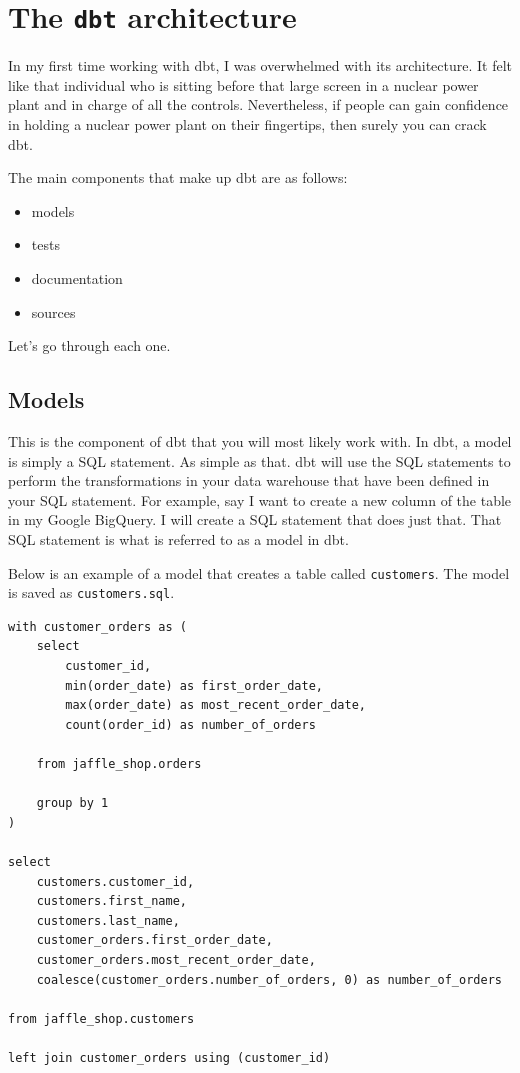 \documentclass[
]{book}
\begin{document}
\hypertarget{the-dbt-architecture}{%
\chapter{\texorpdfstring{The \texttt{dbt} architecture}{The dbt architecture}}\label{the-dbt-architecture}}

In my first time working with dbt, I was overwhelmed with its architecture. It felt like that individual who is sitting before that large screen in a nuclear power plant and in charge of all the controls. Nevertheless, if people can gain confidence in holding a nuclear power plant on their fingertips, then surely you can crack dbt.

The main components that make up dbt are as follows:

\begin{itemize}
\item
  models
\item
  tests
\item
  documentation
\item
  sources
\end{itemize}

Let's go through each one.

\hypertarget{models}{%
\section{Models}\label{models}}

This is the component of dbt that you will most likely work with. In dbt, a model is simply a SQL statement. As simple as that. dbt will use the SQL statements to perform the transformations in your data warehouse that have been defined in your SQL statement. For example, say I want to create a new column of the table in my Google BigQuery. I will create a SQL statement that does just that. That SQL statement is what is referred to as a model in dbt.

Below is an example of a model that creates a table called \texttt{customers}. The model is saved as \texttt{customers.sql}.

\begin{verbatim}
with customer_orders as (
    select
        customer_id,
        min(order_date) as first_order_date,
        max(order_date) as most_recent_order_date,
        count(order_id) as number_of_orders

    from jaffle_shop.orders

    group by 1
)

select
    customers.customer_id,
    customers.first_name,
    customers.last_name,
    customer_orders.first_order_date,
    customer_orders.most_recent_order_date,
    coalesce(customer_orders.number_of_orders, 0) as number_of_orders

from jaffle_shop.customers

left join customer_orders using (customer_id)
\end{verbatim}
\end{document}
